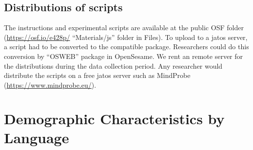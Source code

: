 \documentclass[
  man,floatsintext]{apa7}
\begin{document}
\hypertarget{distributions-of-scripts}{%
\subsection{Distributions of scripts}\label{distributions-of-scripts}}

The instructions and experimental scripts are available at the public OSF folder (\url{https://osf.io/e428p/} ``Materials/js'' folder in Files). To upload to a jatos server, a script had to be converted to the compatible package. Researchers could do this conversion by ``OSWEB'' package in OpenSesame. We rent an remote server for the distributions during the data collection period. Any researcher would distribute the scripts on a free jatos server such as MindProbe (\url{https://www.mindprobe.eu/}).

\hypertarget{demographic-characteristics-by-language}{%
\section{Demographic Characteristics by Language}\label{demographic-characteristics-by-language}}
\end{document}
